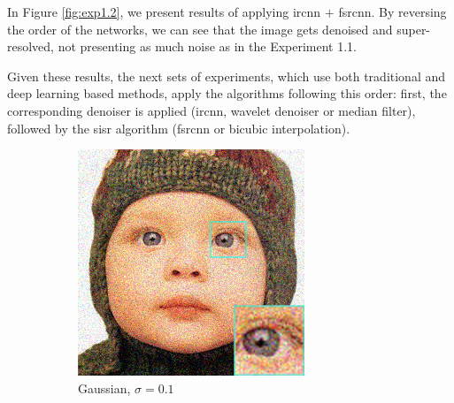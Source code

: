 In Figure \ref{fig:exp1.2}, we present results of applying \gls{ircnn} $+$ \gls{fsrcnn}. By reversing the order of the networks, we can see that the image gets denoised and super-resolved, not presenting as much noise as in the Experiment 1.1.

Given these results, the next sets of experiments, which use both traditional and deep learning based methods, apply the algorithms following this order: first, the corresponding denoiser is applied (\gls{ircnn}, wavelet denoiser or median filter), followed by the \gls{sisr} algorithm (\gls{fsrcnn} or bicubic interpolation).

\begin{figure}
	\centering
	\begin{subfigure}{0.24\textwidth}
		\includegraphics[width=\textwidth]{images/exp1.2/gaussian0.png}
		\caption{Gaussian, $\sigma=0.1$}
	\end{subfigure}
	\begin{subfigure}{0.24\textwidth}

\end{subfigure}
\end{figure}
